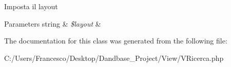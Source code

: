 Imposta il layout


\begin{DoxyParams}[1]{Parameters}
string & {\em \$layout} & \\
\hline
\end{DoxyParams}


The documentation for this class was generated from the following file\+:\begin{DoxyCompactItemize}
\item 
C\+:/\+Users/\+Francesco/\+Desktop/\+Dandbase\+\_\+\+Project/\+View/V\+Ricerca.\+php\end{DoxyCompactItemize}
